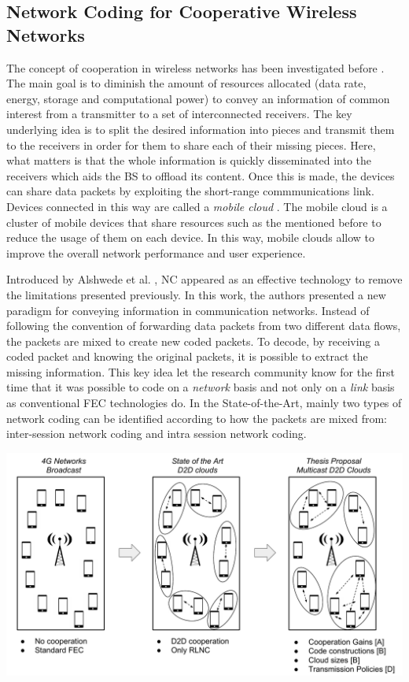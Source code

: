 \subsection{Network Coding for Cooperative Wireless Networks}
The concept of cooperation in wireless networks has been investigated before \cite{fitzek2006cooperation,fitzek2007cognitive,heide2012green,fitzek2013implementation,fitzek2013mobile}. The main goal is to diminish the amount of resources allocated (data rate, energy, storage and computational power) to convey an information of common interest from a transmitter to a set of interconnected receivers. The key underlying idea is to split the desired information into pieces and transmit them to the receivers in order for them to share each of their missing pieces. Here, what matters is that the whole information is quickly disseminated into the receivers which aids the \ac{BS} to offload its content. Once this is made, the devices can share data packets by exploiting the short-range commmunications link. Devices connected in this way are called a \textit{mobile cloud} \cite{fitzek2013mobile}. The mobile cloud is a cluster of mobile devices that share resources such as the mentioned before to reduce the usage of them on each device. In this way, mobile clouds allow to improve the overall network performance and user experience.

Introduced by Alshwede et al. \cite{ahlswede2000network}, \ac{NC} appeared as an effective technology to remove the limitations presented previously. In this work, the authors presented a new paradigm for conveying information in communication networks. Instead of following the convention of forwarding data packets from two different data flows, the packets are mixed to create new coded packets. To decode, by receiving a coded packet and knowing the original packets, it is possible to extract the missing information. This key idea let the research community know for the first time that it was possible to code on a \textit{network} basis and not only on a \textit{link} basis as conventional \ac{FEC} technologies do. In the State-of-the-Art, mainly two types of network coding can be identified according to how the packets are mixed from: inter-session network coding and intra session network coding. 


\includegraphics[width=\textwidth]{introduction/figures/thesis-diagrams.pdf}